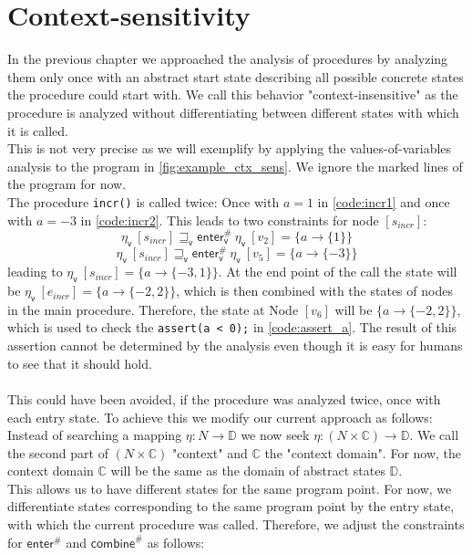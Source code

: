   \section{Context-sensitivity}
    In the previous chapter we approached the analysis of procedures by analyzing them only once with an abstract start state describing all possible concrete states the procedure could start with. We call this behavior "context-insensitive" as the procedure is analyzed without differentiating between different states with which it is called.\\
    This is not very precise as we will exemplify by applying the values-of-variables analysis to the program in \autoref{fig:example_ctx_sens}. We ignore the marked lines of the program for now.\\
    The procedure \texttt{incr()} is called twice: Once with $a = 1$ in \autoref{code:incr1} and once with $a = -3$ in \autoref{code:incr2}. This leads to two constraints for node $[s_{incr}]$: 
      \[\eta_\textsf{v}\ [s_{incr}] \sqsupseteq_\textsf{v} \textsf{enter}^{\#}_\textsf{v}\ \eta_\textsf{v}\ [v_2] = \{a \rightarrow \{1\} \} \]
      \[\eta_\textsf{v}\ [s_{incr}] \sqsupseteq_\textsf{v} \textsf{enter}^{\#}_\textsf{v}\ \eta_\textsf{v}\ [v_5] = \{a \rightarrow \{-3\} \} \]
    leading to $\eta_\textsf{v}\ [s_{incr}] = \{a \rightarrow \{-3, 1\}\}$. At the end point of the call the state will be $\eta_\textsf{v}\ [e_{incr}] = \{a \rightarrow \{-2, 2\}\}$, which is then combined with the states of nodes in the main procedure. Therefore, the state at Node $[v_6]$ will be $\{a \rightarrow \{-2, 2\}\}$, which is used to check the \texttt{assert(a < 0);} in \autoref{code:assert_a}. The result of this assertion cannot be determined by the analysis even though it is easy for humans to see that it should hold.\\
    \\
    This could have been avoided, if the procedure was analyzed twice, once with each entry state. To achieve this we modify our current approach as follows: Instead of searching a mapping $\eta: N \rightarrow \mathbb{D}$ we now seek $\eta: (N \times \mathbb{C}) \rightarrow \mathbb{D}$. We call the second part of $(N \times \mathbb{C})$ "context" and $\mathbb{C}$ the "context domain". For now, the context domain $\mathbb{C}$ will be the same as the domain of abstract states $\mathbb{D}$.\\
    This allows us to have different states for the same program point. For now, we differentiate states corresponding to the same program point by the entry state, with which the current procedure was called. Therefore, we adjust the constraints for $\textsf{enter}^{\#}$ and $\textsf{combine}^{\#}$ as follows:
